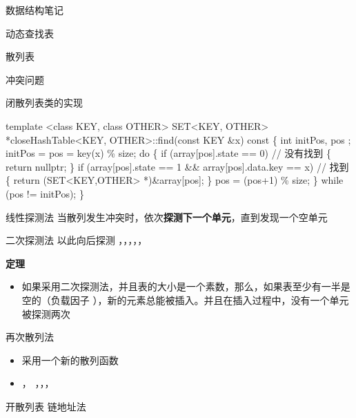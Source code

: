 \documentclass[
  ignorenonframetext,
]{beamer}
\newenvironment{Shaded}{}{}
\newcommand{\NormalTok}[1]{#1}
\providecommand{\tightlist}{%
  \setlength{\itemsep}{0pt}\setlength{\parskip}{0pt}}
\begin{document}
\begin{frame}[fragile]{数据结构笔记}
\begin{block}{动态查找表}
\begin{block}{散列表}
\begin{block}{冲突问题}
\begin{block}{闭散列表类的实现}
\begin{Shaded}
\begin{Highlighting}[]
\NormalTok{template \textless{}class KEY, class OTHER\textgreater{}}
\NormalTok{SET\textless{}KEY, OTHER\textgreater{} *closeHashTable\textless{}KEY, OTHER\textgreater{}::find(const KEY \&x) const}
\NormalTok{\{}
\NormalTok{  int initPos, pos ;}
\NormalTok{  initPos = pos = key(x) \% size;}
\NormalTok{  do}
\NormalTok{  \{}
\NormalTok{    if (array[pos].state == 0) // 没有找到}
\NormalTok{    \{}
\NormalTok{      return nullptr;}
\NormalTok{    \}}
\NormalTok{    if (array[pos].state == 1 \&\& array[pos].data.key == x) // 找到}
\NormalTok{    \{}
\NormalTok{      return (SET\textless{}KEY,OTHER\textgreater{} *)\&array[pos];}
\NormalTok{    \}}
\NormalTok{    pos = (pos+1) \% size;}
\NormalTok{  \} while (pos != initPos);}
\NormalTok{\}}
\end{Highlighting}
\end{Shaded}

\begin{block}{线性探测法}
\protect{}\label{ux7ebfux6027ux63a2ux6d4bux6cd5}
当散列发生冲突时，依次\textbf{探测下一个单元}，直到发现一个空单元

\end{block}

\begin{block}{二次探测法}
\protect{}\label{ux4e8cux6b21ux63a2ux6d4bux6cd5}
以此向后探测 {}，{}，{}，{}，{}，{}

\textbf{定理}

\begin{itemize}
\tightlist
\item
  如果采用二次探测法，并且表的大小是一个素数，那么，如果表至少有一半是空的（负载因子
  {}），新的元素总能被插入。并且在插入过程中，没有一个单元被探测两次
\end{itemize}
\end{block}

\begin{block}{再次散列法}
\protect{}\label{ux518dux6b21ux6563ux5217ux6cd5}
\begin{itemize}
\tightlist
\item
  采用一个新的散列函数 {}
\item
  {}，{} ，{}，{}，{}
\end{itemize}
\end{block}
\end{block}

\begin{block}{开散列表}
\protect{}\label{ux5f00ux6563ux5217ux8868}
链地址法


\end{block}
\end{block}
\end{block}
\end{block}
\end{frame}
\end{document}
